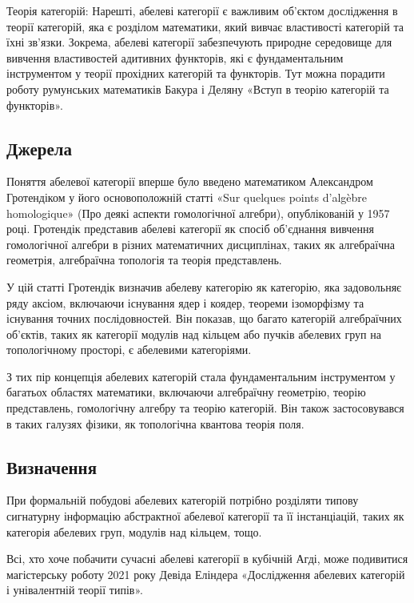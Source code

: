 Теорія категорій: Нарешті, абелеві категорії є важливим об'єктом
дослідження в теорії категорій, яка є розділом математики, який
вивчає властивості категорій та їхні зв’язки. Зокрема, абелеві
категорії забезпечують природне середовище для вивчення властивостей
адитивних функторів, які є фундаментальним інструментом у теорії
прохідних категорій та функторів. Тут можна порадити роботу румунських
математиків Бакура і Деляну «Вступ в теорію категорій та функторів».

\subsection*{Джерела}

Поняття абелевої категорії вперше було введено математиком
Александром Гротендіком у його основоположній статті «Sur quelques
points d'algèbre homologique» (Про деякі аспекти гомологічної алгебри),
опублікованій у 1957 році. Гротендік представив абелеві категорії як
спосіб об’єднання вивчення гомологічної алгебри в різних математичних
дисциплінах, таких як алгебраїчна геометрія, алгебраїчна топологія та
теорія представлень.

У цій статті Гротендік визначив абелеву категорію як категорію,
яка задовольняє ряду аксіом, включаючи існування ядер і коядер,
теореми ізоморфізму та існування точних послідовностей. Він показав,
що багато категорій алгебраїчних об'єктів, таких як категорії модулів
над кільцем або пучків абелевих груп на топологічному просторі, є абелевими категоріями.

З тих пір концепція абелевих категорій стала фундаментальним
інструментом у багатьох областях математики, включаючи алгебраїчну
геометрію, теорію представлень, гомологічну алгебру та теорію категорій.
Він також застосовувався в таких галузях фізики, як топологічна квантова теорія поля.

\subsection*{Визначення}

При формальній побудові абелевих категорій потрібно розділяти
типову сигнатурну інформацію абстрактної абелевої категорії
та її інстанціацій, таких як категорія абелевих груп, модулів над кільцем, тощо.

Всі, хто хоче побачити сучасні абелеві категорії в кубічній Агді,
може подивитися магістерську роботу 2021 року Девіда Еліндера «Дослідження
абелевих категорій і унівалентній теорії типів».

